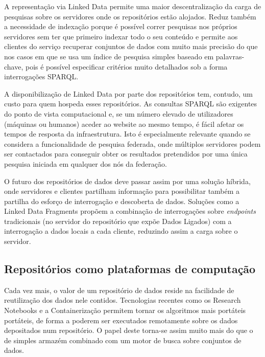 \documentclass[sigconf,nonacm]{acmart}
\begin{document}
A representação via Linked Data permite uma maior descentralização da carga de pesquisas sobre os servidores onde os repositórios estão alojados. Reduz também a necessidade de indexação porque é possível correr pesquisas nos próprios servidores sem ter que primeiro indexar todo o seu conteúdo e permite aos clientes do serviço recuperar conjuntos de dados com muito mais precisão do que nos casos em que se usa um índice de pesquisa simples baseado em palavras-chave, pois é possível especificar critérios muito detalhados sob a forma interrogações SPARQL.

A disponibilização de Linked Data por parte dos repositórios tem, contudo, um custo para quem hospeda esses repositórios. As consultas SPARQL são exigentes do ponto de vista computacional e, se um número elevado de utilizadores (máquinas ou humanos) aceder ao website ao mesmo tempo, é fácil afetar os tempos de resposta da infraestrutura. Isto é especialmente relevante quando se considera a funcionalidade de pesquisa federada, onde múltiplos servidores podem ser contactados para conseguir obter os resultados pretendidos por uma única pesquisa iniciada em qualquer dos nós da federação.

O futuro dos repositórios de dados deve passar assim por uma solução híbrida, onde servidores e clientes partilham informação para possibilitar também a partilha do esforço de interrogação e descoberta de dados. Soluções como a Linked Data Fragments\cite{VERBORGH2016184} propõem a combinação de interrogações sobre \textit{endpoints} tradicionais (no servidor do repositório que expõe Dados Ligados) com a interrogação a dados locais a cada cliente, reduzindo assim a carga sobre o servidor.


\subsection{Repositórios como plataformas de computação} %
\label{sub:repositorios_como_plataformas_de_computacao}

Cada vez mais, o valor de um repositório de dados reside na facilidade de reutilização dos dados nele contidos. Tecnologias recentes como os Research Notebooks e a Containerização permitem tornar os algoritmos mais portáteis portáteis, de forma a poderem ser executados remotamente sobre os dados depositados num repositório. O papel deste torna-se assim muito mais do que o de simples armazém combinado com um motor de busca sobre conjuntos de dados.
\end{document}
